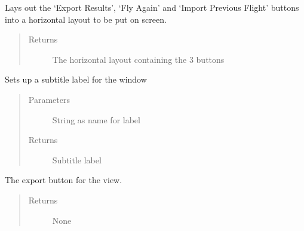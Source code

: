 \documentclass[letterpaper,10pt,english]{sphinxmanual}
\begin{document}
\begin{fulllineitems}
\begin{fulllineitems}
\label{\detokenize{index:src.Views.View_ReportScreen.ReportWindow.setButtonLayout}}
Lays out the ‘Export Results’, ‘Fly Again’ and ‘Import Previous Flight’ buttons into a horizontal layout to be
put on screen.
\begin{quote}\begin{description}
\item[{Returns}] \leavevmode
The horizontal layout containing the 3 buttons

\end{description}\end{quote}

\end{fulllineitems}


\begin{fulllineitems}
\label{\detokenize{index:src.Views.View_ReportScreen.ReportWindow.setSubTitle}}
Sets up a subtitle label for the window
\begin{quote}\begin{description}
\item[{Parameters}] \leavevmode
{} \textendash{} String as name for label

\item[{Returns}] \leavevmode
Subtitle label

\end{description}\end{quote}

\end{fulllineitems}


\begin{fulllineitems}
\label{\detokenize{index:src.Views.View_ReportScreen.ReportWindow.set_BtnExport}}
The export button for the view.
\begin{quote}\begin{description}
\item[{Returns}] \leavevmode
None


\end{description}
\end{quote}
\end{fulllineitems}
\end{fulllineitems}
\end{document}
